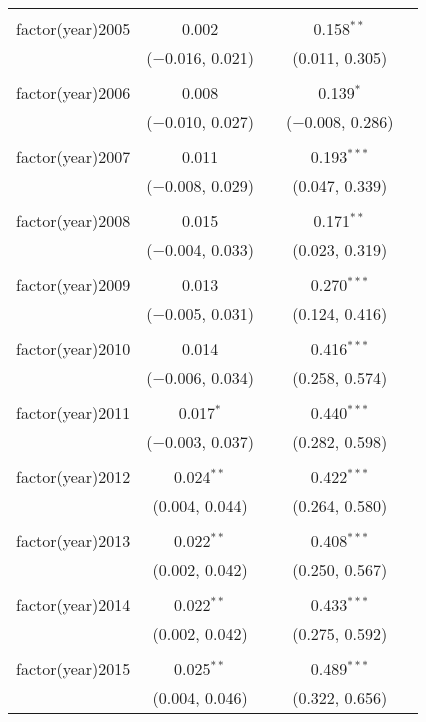 \begin{table}[!htbp]
\begin{tabular}{@{\extracolsep{5pt}}lcccc}
  & & & & \\ 
 factor(year)2005 & 0.002 &  & 0.158$^{**}$ &  \\ 
  & ($-$0.016, 0.021) &  & (0.011, 0.305) &  \\ 
  & & & & \\ 
 factor(year)2006 & 0.008 &  & 0.139$^{*}$ &  \\ 
  & ($-$0.010, 0.027) &  & ($-$0.008, 0.286) &  \\ 
  & & & & \\ 
 factor(year)2007 & 0.011 &  & 0.193$^{***}$ &  \\ 
  & ($-$0.008, 0.029) &  & (0.047, 0.339) &  \\ 
  & & & & \\ 
 factor(year)2008 & 0.015 &  & 0.171$^{**}$ &  \\ 
  & ($-$0.004, 0.033) &  & (0.023, 0.319) &  \\ 
  & & & & \\ 
 factor(year)2009 & 0.013 &  & 0.270$^{***}$ &  \\ 
  & ($-$0.005, 0.031) &  & (0.124, 0.416) &  \\ 
  & & & & \\ 
 factor(year)2010 & 0.014 &  & 0.416$^{***}$ &  \\ 
  & ($-$0.006, 0.034) &  & (0.258, 0.574) &  \\ 
  & & & & \\ 
 factor(year)2011 & 0.017$^{*}$ &  & 0.440$^{***}$ &  \\ 
  & ($-$0.003, 0.037) &  & (0.282, 0.598) &  \\ 
  & & & & \\ 
 factor(year)2012 & 0.024$^{**}$ &  & 0.422$^{***}$ &  \\ 
  & (0.004, 0.044) &  & (0.264, 0.580) &  \\ 
  & & & & \\ 
 factor(year)2013 & 0.022$^{**}$ &  & 0.408$^{***}$ &  \\ 
  & (0.002, 0.042) &  & (0.250, 0.567) &  \\ 
  & & & & \\ 
 factor(year)2014 & 0.022$^{**}$ &  & 0.433$^{***}$ &  \\ 
  & (0.002, 0.042) &  & (0.275, 0.592) &  \\ 
  & & & & \\ 
 factor(year)2015 & 0.025$^{**}$ &  & 0.489$^{***}$ &  \\ 
  & (0.004, 0.046) &  & (0.322, 0.656) &  \\ 

\end{tabular}
\end{table}

